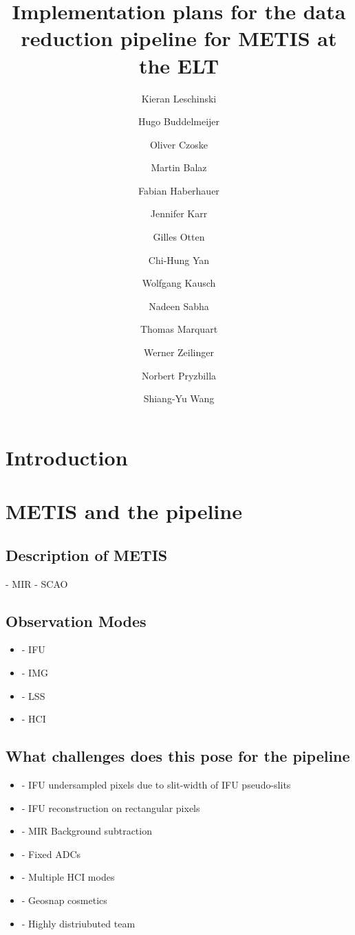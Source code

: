 \documentclass[]{spie}  %
\title{Implementation plans for the data reduction pipeline for METIS at the ELT }
\author[a]{Kieran Leschinski}
\author[a]{Hugo Buddelmeijer}
\author[a]{Oliver Czoske}
\author[a]{Martin Balaz}
\author[a]{Fabian Haberhauer}
\author[a]{Jennifer Karr}
\author[a]{Gilles Otten}
\author[a]{Chi-Hung Yan}
\author[a]{Wolfgang Kausch}
\author[a]{Nadeen Sabha}
\author[a]{Thomas Marquart}
\author[a]{Werner Zeilinger}
\author[a]{Norbert Pryzbilla}
\author[a]{Shiang-Yu Wang}
\affil[a]{University of Vienna, T\"urkenschanztra\ss e 18, 1180 Vienna, Austria}
\begin{document}
 
\maketitle

\begin{abstract}

\end{abstract}



\section{Introduction}
\label{sec:introduction}


\section{METIS and the pipeline}
\label{sec:environment}

\subsection{Description of METIS}
\label{ssec:env_metis}
	- MIR
	- SCAO
\subsection{Observation Modes}
\label{ssec:env_modes}
 \begin{itemize}
     \item - IFU
     \item - IMG
     \item - LSS
     \item - HCI
 \end{itemize}
 
\subsection{What challenges does this pose for the pipeline}
\label{ssec:env_challenges}

\begin{itemize}
    \item - IFU undersampled pixels due to slit-width of IFU pseudo-slits
    \item - IFU reconstruction on rectangular pixels
    \item - MIR Background subtraction
    \item - Fixed ADCs
    \item - Multiple HCI modes
    \item - Geosnap cosmetics
    \item - Highly distriubuted team

\end{itemize}
\end{document}
